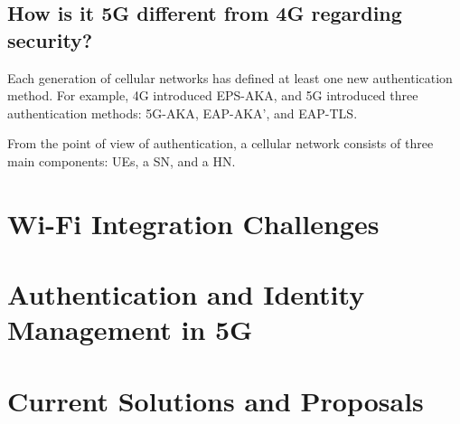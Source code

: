 \subsection{How is it \ac{5G} different from 4G regarding security?}

Each generation of cellular networks has defined at least one new authentication method. For example, \ac{4G} introduced EPS-AKA, and 5G introduced three authentication methods: \ac{5G-AKA}, \ac{EAP-AKA’}, and \ac{EAP-TLS}.

From the point of view of authentication, a cellular network consists of three main components: \acp{UE}, a \ac{SN}, and a \ac{HN}.

\section{Wi-Fi Integration Challenges}

\section{Authentication and Identity Management in \ac{5G}}

\section{Current Solutions and Proposals}